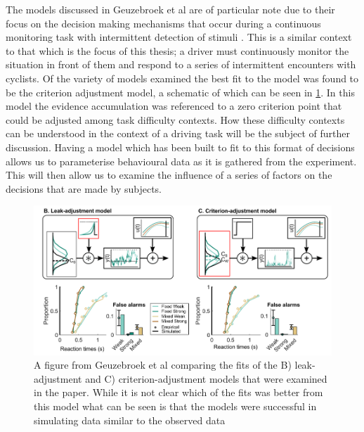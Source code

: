 The models discussed in Geuzebroek et al are of particular note due to their focus on the decision making mechanisms that occur during a continuous monitoring task with intermittent detection of stimuli \cite{geuzebroekBalancingTrueFalse2023}. This is a similar context to that which is the focus of this thesis; a driver must continuously monitor the situation in front of them and respond to a series of intermittent encounters with cyclists. Of the variety of models examined the best fit to the model was found to be the criterion adjustment model, a schematic of which can be seen in \ref{fig:Anna}. In this model the evidence accumulation was referenced to a zero criterion point that could be adjusted among task difficulty contexts. How these difficulty contexts can be understood in the context of a driving task will be the subject of further discussion.
Having a model which has been built to fit to this format of decisions allows us to parameterise behavioural data as it is gathered from the experiment. This will then allow us to examine the influence of a series of factors on the decisions that are made by subjects.
\begin{figure}
    \centering
    \includegraphics[width=0.75\linewidth]{figures/Anna.PNG}
    \caption{A figure from Geuzebroek et al comparing the fits of the B) leak-adjustment and C) criterion-adjustment models that were examined in the paper. While it is not clear which of the fits was better from this model what can be seen is that the models were successful in simulating data similar to the observed data \cite{geuzebroekBalancingTrueFalse2023}}
    \label{fig:Anna}
\end{figure}

